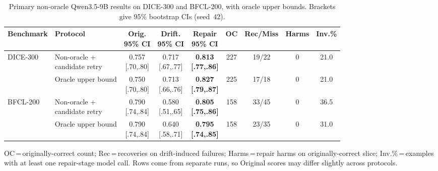 \documentclass{llncs}
\begin{document}
\begin{table}[t]
\caption{Primary non-oracle Qwen3.5-9B results on DICE-300 and BFCL-200, with
oracle upper bounds. Brackets give 95\% bootstrap CIs (seed~42).}
\label{tab:main-results}
\centering
\scriptsize
\setlength{\tabcolsep}{2.2pt}
\begin{tabular}{llccccccc}
\toprule
Benchmark & Protocol & \shortstack{Orig.\\95\% CI} & \shortstack{Drift.\\95\% CI} &
\shortstack{Repair\\95\% CI} & OC & Rec/Miss & Harms & Inv.\% \\
\midrule
\multirow{2}{*}{DICE-300}
& \shortstack[l]{Non-oracle +\\candidate retry}
& \shortstack{0.757\\{[.70,.80]}} & \shortstack{0.717\\{[.67,.77]}}
& \shortstack{\textbf{0.813}\\\textbf{[.77,.86]}} & 227 & 19/22 & 0 & 21.0 \\
& Oracle upper bound
& \shortstack{0.750\\{[.70,.80]}} & \shortstack{0.713\\{[.66,.76]}}
& \shortstack{\textbf{0.827}\\\textbf{[.79,.87]}} & 225 & 17/18 & 0 & 21.0 \\
\midrule
\multirow{2}{*}{BFCL-200}
& \shortstack[l]{Non-oracle +\\candidate retry}
& \shortstack{0.790\\{[.74,.84]}} & \shortstack{0.580\\{[.51,.65]}}
& \shortstack{\textbf{0.805}\\\textbf{[.75,.86]}} & 158 & 33/45 & 0 & 36.5 \\
& Oracle upper bound
& \shortstack{0.790\\{[.74,.84]}} & \shortstack{0.640\\{[.58,.71]}}
& \shortstack{\textbf{0.795}\\\textbf{[.74,.85]}} & 158 & 23/35 & 0 & 31.0 \\
\bottomrule
\end{tabular}
\par\smallskip\raggedright\scriptsize
OC\,=\,originally-correct count; Rec\,=\,recoveries on drift-induced failures;
Harms\,=\,repair harms on originally-correct slice; Inv.\%\,=\,examples with at
least one repair-stage model call.
Rows come from separate runs, so Original scores may differ slightly across protocols.
\end{table}
\end{document}
